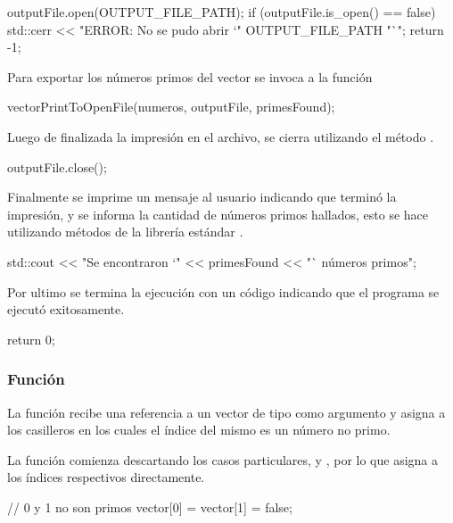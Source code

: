 \documentclass[12pt]{article}
\newenvironment{fullgrayverb}
{\verbbox}
{\endverbbox\par\colorbox{gray!25}{\parbox{\textwidth}{\theverbbox}}\par}
\begin{document}
\begin{fullgrayverb}[\mbox{}]
outputFile.open(OUTPUT_FILE_PATH);
if (outputFile.is_open() == false) {
    std::cerr << "ERROR: No se pudo abrir `" OUTPUT_FILE_PATH "`\n";
    return -1;
}
\end{fullgrayverb}

Para exportar los números primos del vector se invoca a la función
\linebreak{}

\begin{fullgrayverb}[\mbox{}]
vectorPrintToOpenFile(numeros, outputFile, primesFound);
\end{fullgrayverb}

Luego de finalizada la impresión en el archivo, se cierra utilizando el método
.

\begin{fullgrayverb}[\mbox{}]
outputFile.close();
\end{fullgrayverb}

Finalmente se imprime un mensaje al usuario indicando que terminó la impresión,
y se informa la cantidad de números primos hallados, esto se hace utilizando
métodos de la librería estándar .

\begin{fullgrayverb}[\mbox{}]
std::cout << "Se encontraron `" << primesFound << "` números primos\n";
\end{fullgrayverb}

Por ultimo se termina la ejecución con un código  indicando que el
programa se ejecutó exitosamente.

\begin{fullgrayverb}[\mbox{}]
return 0;
\end{fullgrayverb}

\subsubsection{Función }

La función  recibe una referencia a un vector de
tipo  como argumento y asigna  a los casilleros en los
cuales el índice del mismo es un número no primo. 

La función comienza descartando los casos particulares,  y , por
lo que asigna  a los índices respectivos directamente.

\begin{fullgrayverb}[\mbox{}]
// 0 y 1 no son primos
vector[0] = vector[1] = false;
\end{fullgrayverb}
\end{document}
